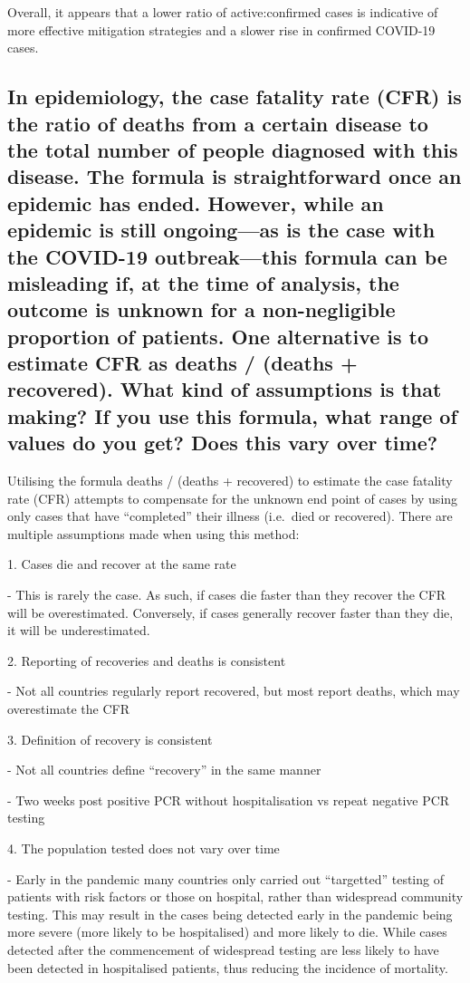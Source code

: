 \documentclass[8pt]{article}
\begin{document}
Overall, it appears that a lower ratio of active:confirmed cases is indicative of more effective mitigation strategies and a slower rise in confirmed COVID-19 cases.\subsection{In epidemiology, the case fatality rate (CFR) is the ratio of deaths from a certain disease to the total number of people diagnosed with this disease. The formula is straightforward once an epidemic has ended. However, while an epidemic is still ongoing—as is the case with the COVID-19 outbreak—this formula can be misleading if, at the time of analysis, the outcome is unknown for a non-negligible proportion of patients. One alternative is to estimate CFR as deaths / (deaths + recovered). What kind of assumptions is that making? If you use this formula, what range of values do you get? Does this vary over time?}
    Utilising the formula deaths / (deaths + recovered) to estimate the case
fatality rate (CFR) attempts to compensate for the unknown end point of
cases by using only cases that have ``completed'' their illness
(i.e.~died or recovered). There are multiple assumptions made when using
this method: 

1. Cases die and recover at the same rate 


- This is rarely the case. As such, if cases die faster than they recover the CFR will be
overestimated. Conversely, if cases generally recover faster than they
die, it will be underestimated. 


2. Reporting of recoveries and deaths is
consistent 


- Not all countries regularly report recovered, but most
report deaths, which may overestimate the CFR 


3. Definition of recovery is consistent 


- Not all countries define ``recovery'' in the same manner


- Two weeks post positive PCR without hospitalisation vs repeat negative
PCR testing 


4. The population tested does not vary over time 


- Early in the pandemic many countries only carried out ``targetted'' testing of
patients with risk factors or those on hospital, rather than widespread
community testing. This may result in the cases being detected early in
the pandemic being more severe (more likely to be hospitalised) and more
likely to die. While cases detected after the commencement of widespread
testing are less likely to have been detected in hospitalised patients,
thus reducing the incidence of mortality.
\end{document}
